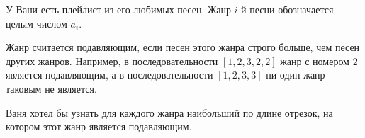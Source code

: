 У Вани есть плейлист из его любимых песен. Жанр $i$-й песни обозначается целым числом  $a_i$.

Жанр считается подавляющим, если песен этого жанра строго больше, чем песен других жанров. Например, в последовательности $[1, 2, 3, 2, 2]$ жанр с номером $2$ является подавляющим, а в последовательности $[1, 2, 3, 3]$ ни один жанр таковым не является.

Ваня хотел бы узнать для каждого жанра наибольший по длине отрезок, на котором этот жанр является подавляющим. 
